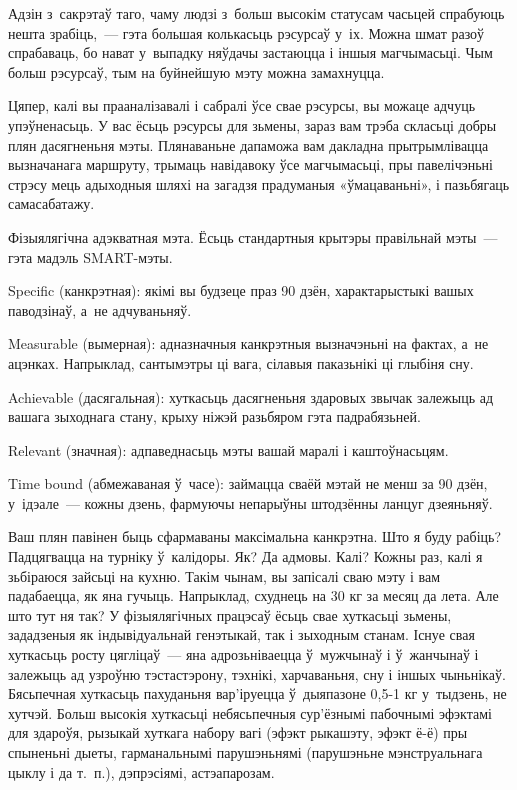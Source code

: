 Адзін з~сакрэтаў таго, чаму людзі з~больш высокім статусам часьцей спрабуюць нешта зрабіць,~--- гэта большая колькасьць рэсурсаў у~іх. Можна шмат разоў спрабаваць, бо нават у~выпадку няўдачы застаюцца і іншыя магчымасьці. Чым больш рэсурсаў, тым на буйнейшую мэту можна замахнуцца.

Цяпер, калі вы прааналізавалі і сабралі ўсе свае рэсурсы, вы можаце адчуць упэўненасьць. У вас ёсьць рэсурсы для зьмены, зараз вам трэба скласьці добры плян дасягненьня мэты. Плянаваньне дапаможа вам дакладна прытрымлівацца вызначанага маршруту, трымаць навідавоку ўсе магчымасьці, пры павелічэньні стрэсу мець адыходныя шляхі на загадзя прадуманыя «ўмацаваньні», і пазьбягаць самасабатажу.

Фізыялягічна адэкватная мэта. Ёсьць стандартныя крытэры правільнай мэты~--- гэта мадэль SMART-мэты. 

Specific (канкрэтная): якімі вы будзеце праз 90 дзён, характарыстыкі вашых паводзінаў, а~не адчуваньняў. 

Measurable (вымерная): адназначныя канкрэтныя вызначэньні на фактах, а~не ацэнках. Напрыклад, сантымэтры ці вага, сілавыя паказьнікі ці глыбіня сну. 

Achievable (дасягальная): хуткасьць дасягненьня здаровых звычак залежыць ад вашага зыходнага стану, крыху ніжэй разьбяром гэта падрабязьней. 

Relevant (значная): адпаведнасьць мэты вашай маралі і каштоўнасьцям. 

Time bound (абмежаваная ў~часе): займацца сваёй мэтай не менш за 90 дзён, у~ідэале~--- кожны дзень, фармуючы непарыўны штодзённы ланцуг дзеяньняў. 

Ваш плян павінен быць сфармаваны максімальна канкрэтна. Што я буду рабіць? Падцягвацца на турніку ў~калідоры. Як? Да адмовы. Калі? Кожны раз, калі я зьбіраюся зайсьці на кухню. Такім чынам, вы запісалі сваю мэту і вам падабаецца, як яна гучыць. Напрыклад, схуднець на 30 кг за месяц да лета. Але што тут ня так? У фізыялягічных працэсаў ёсьць свае хуткасьці зьмены, зададзеныя як індывідуальнай генэтыкай, так і зыходным станам. Існуе свая хуткасьць росту цягліцаў~--- яна адрозьніваецца ў~мужчынаў і ў~жанчынаў і залежыць ад узроўню тэстастэрону, тэхнікі, харчаваньня, сну і іншых чыньнікаў. Бясьпечная хуткасьць пахуданьня вар'іруецца ў~дыяпазоне 0,5-1 кг у~тыдзень, не хутчэй. Больш высокія хуткасьці небясьпечныя сур'ёзнымі пабочнымі эфэктамі для здароўя, рызыкай хуткага набору вагі (эфэкт рыкашэту, эфэкт ё-ё) пры спыненьні дыеты, гарманальнымі парушэньнямі (парушэньне мэнструальнага цыклу і да т.~п.), дэпрэсіямі, астэапарозам. 

